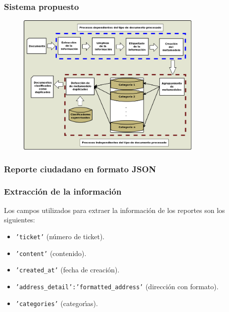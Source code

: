 \documentclass{beamer}
\begin{document}
\begin{frame}
  \frametitle{Sistema propuesto}
  \begin{figure}
    \centering
    \includegraphics[width = 0.8\textwidth]{imagenes/diagrama2_tesis.png}
  \end{figure}
\end{frame}

\begin{frame}
  \frametitle{Reporte ciudadano en formato JSON}
  \begin{minipage}{0.1\linewidth}
  \end{minipage}
  \begin{center}
  \begin{minipage}{0.8\linewidth}
    \begin{figure}
      
    \end{figure}
  \end{minipage}
  \end{center}
  \begin{minipage}{0.1\linewidth}
  \end{minipage}
\end{frame}

\begin{frame}
  \frametitle{Extracci\'{o}n de la informaci\'{o}n}
  Los campos utilizados para extraer la informaci\'{o}n de los reportes son los siguientes:
  \begin{itemize}
  \item \texttt{'ticket'} (n\'{u}mero de ticket).
  \item \texttt{'content'} (contenido).
  \item \texttt{'created\_at'} (fecha de creaci\'{o}n).
  \item \texttt{'address\_detail':'formatted\_address'} (direcci\'{o}n con formato).
  \item \texttt{'categories'} (categor\'{\i}as).
  \end{itemize}
\end{frame}
\end{document}
